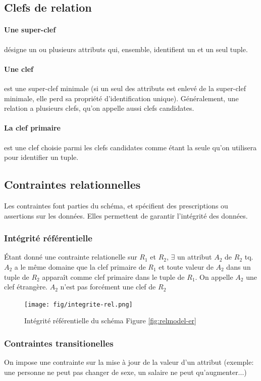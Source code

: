 \documentclass[a4paper]{article}
\begin{document}
\subsection{Clefs de relation}

\paragraph{Une super-clef} désigne un ou plusieurs attributs qui, ensemble, identifient
un et un seul tuple.

\paragraph{Une clef} est une super-clef minimale (si un seul des attributs est
enlevé de la super-clef minimale, elle perd sa propriété d'identification unique).
Généralement, une relation a plusieurs clefs, qu'on appelle aussi clefs candidates.

\paragraph{La clef primaire} est une clef choisie parmi les clefs candidates comme étant
la seule qu'on utilisera pour identifier un tuple.

\subsection{Contraintes relationnelles}
Les contraintes font parties du schéma, et spécifient des prescriptions ou
assertions sur les données. Elles permettent de garantir l'intégrité des données.

\subsubsection{Intégrité référentielle}
\'Etant donné une contrainte relationelle sur $R_1$ et $R_2$, $\exists$ un attribut
$A_2$ de $R_2$ tq. $A_2$ a le même domaine que la clef primaire de $R_1$ et toute
valeur de $A_2$ dans un tuple de $R_2$ apparaît comme clef primaire dans le tuple
de $R_1$. On appelle $A_2$ une clef étrangère. $A_2$ n'est pas forcément une clef
de $R_2$

\begin{figure}[H]
    \center
    \texttt{[image: fig/integrite-rel.png]}
    \caption{Intégrité référentielle du schéma Figure \ref{fig:relmodel-er}}
\end{figure}

\subsubsection{Contraintes transitionelles}
On impose une contrainte sur la mise à jour de la valeur d'un attribut (exemple:
une personne ne peut pas changer de sexe, un salaire ne peut qu'augmenter...)
\end{document}
